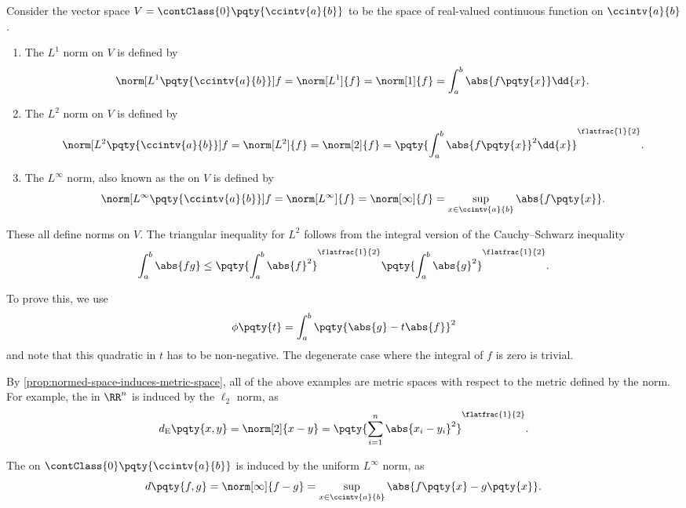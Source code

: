 \begin{example}
    Consider the vector space \(V = \contClass{0} \pqty{\ccintv{a}{b}}\) to be the space of real-valued continuous function on \(\ccintv{a}{b}\).

    \begin{enumerate}
        \item The \(L^1\) norm on \(V\) is defined by
        \[
            \norm[L^1\pqty{\ccintv{a}{b}}]{f} = \norm[L^1]{f} = \norm[1]{f} = \int_{a}^{b} \abs{f\pqty{x}} \dd{x}.
        \]

        \item The \(L^2\) norm on \(V\) is defined by
        \[
            \norm[L^2\pqty{\ccintv{a}{b}}]{f} = \norm[L^2]{f} = \norm[2]{f} = \pqty{\int_{a}^{b} \abs{f\pqty{x}}^2 \dd{x}}^{\flatfrac{1}{2}}.
        \]

        \item The \(L^\infty\) norm, also known as the  on \(V\) is defined by
        \[
            \norm[L^\infty\pqty{\ccintv{a}{b}}]{f} = \norm[L^\infty]{f} = \norm[\infty]{f} = \sup_{x \in \ccintv{a}{b}} \abs{f\pqty{x}}.
        \]
    \end{enumerate}

    These all define norms on \(V\). The triangular inequality for \(L^2\) follows from the integral version of the Cauchy--Schwarz inequality
    \[
        \int_{a}^{b} \abs{fg} \leq \pqty{\int_{a}^{b} \abs{f}^2}^{\flatfrac{1}{2}} \pqty{\int_{a}^{b} \abs{g}^2}^{\flatfrac{1}{2}}.
    \]

    To prove this, we use
    \[
        \phi\pqty{t} = \int_{a}^{b} \pqty{\abs{g} - t \abs{f}}^2
    \]
    and note that this quadratic in \(t\) has to be non-negative. The degenerate case where the integral of \(f\) is zero is trivial.
\end{example}

By \autoref{prop:normed-space-induces-metric-space}, all of the above examples are metric spaces with respect to the metric defined by the norm. For example, the  in \(\RR^n\) is induced by the \(\ell_2\) norm, as
\[
    d_{\text{E}} \pqty{x, y} = \norm[2]{x - y} = \pqty{\sum_{i = 1}^{n} \abs{x_i - y_i}^2}^{\flatfrac{1}{2}}.
\]

The  on \(\contClass{0}\pqty{\ccintv{a}{b}}\) is induced by the uniform \(L^\infty\) norm, as
\[
    d\pqty{f, g} = \norm[\infty]{f - g} = \sup_{x \in \ccintv{a}{b}} \abs{f\pqty{x} - g\pqty{x}}.
\]

